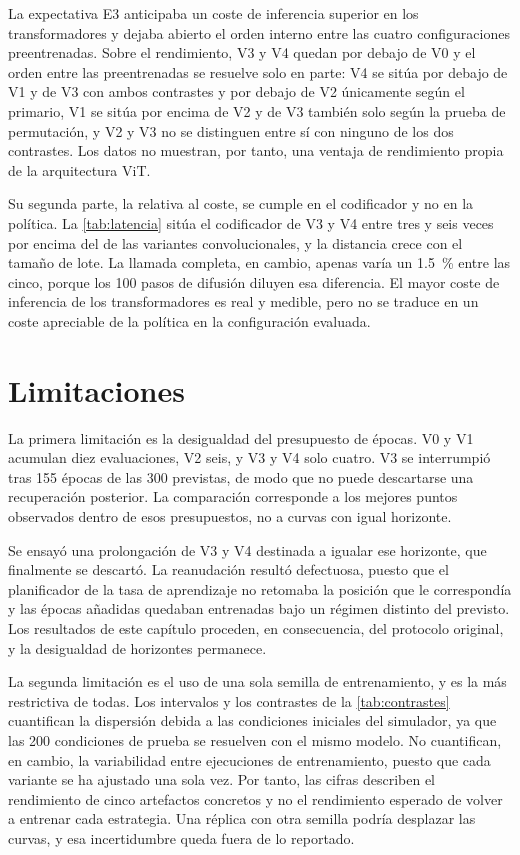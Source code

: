 La expectativa E3 anticipaba un coste de inferencia superior en los transformadores y
dejaba abierto el orden interno entre las cuatro configuraciones preentrenadas. Sobre el
rendimiento, V3 y V4 quedan por debajo de V0 y el orden entre las preentrenadas se resuelve
solo en parte: V4 se sit\'ua por debajo de V1 y de V3 con ambos contrastes y por debajo de V2
\'unicamente seg\'un el primario, V1 se sit\'ua por encima de V2 y de V3 tambi\'en solo
seg\'un la prueba de permutaci\'on, y V2 y V3 no se distinguen entre s\'i con ninguno de los
dos contrastes. Los datos no muestran, por tanto, una ventaja de
rendimiento propia de la arquitectura ViT.

Su segunda parte, la relativa al coste, se cumple en el codificador y no en la pol\'itica.
La \cref{tab:latencia} sit\'ua el codificador de V3 y V4 entre tres y seis veces por encima
del de las variantes convolucionales, y la distancia crece con el tama\~no de lote. La
llamada completa, en cambio, apenas var\'ia un \SI{1.5}{\percent} entre las cinco, porque
los \num{100} pasos de difusi\'on diluyen esa diferencia. El mayor coste de inferencia de
los transformadores es real y medible, pero no se traduce en un coste apreciable de la
pol\'itica en la configuraci\'on evaluada.

\section{Limitaciones}
\label{sec:limitaciones}

La primera limitaci\'on es la desigualdad del presupuesto de \'epocas. V0 y V1 acumulan
diez evaluaciones, V2 seis, y V3 y V4 solo cuatro. V3 se interrumpi\'o tras \num{155}
\'epocas de las \num{300} previstas, de modo que no puede descartarse una recuperaci\'on
posterior. La comparaci\'on corresponde a los mejores puntos observados dentro de esos
presupuestos, no a curvas con igual horizonte.

Se ensay\'o una prolongaci\'on de V3 y V4 destinada a igualar ese horizonte, que finalmente
se descart\'o. La reanudaci\'on result\'o defectuosa, puesto que el planificador de la tasa
de aprendizaje no retomaba la posici\'on que le correspond\'ia y las \'epocas a\~nadidas
quedaban entrenadas bajo un r\'egimen distinto del previsto. Los resultados de este
cap\'itulo proceden, en consecuencia, del protocolo original, y la desigualdad de
horizontes permanece.

La segunda limitaci\'on es el uso de una sola semilla de entrenamiento, y es la m\'as
restrictiva de todas. Los intervalos y los contrastes de la \cref{tab:contrastes}
cuantifican la dispersi\'on debida a las condiciones iniciales del simulador, ya que las
\num{200} condiciones de prueba se resuelven con el mismo modelo. No cuantifican, en
cambio, la variabilidad entre ejecuciones de entrenamiento, puesto que cada variante se ha
ajustado una sola vez. Por tanto, las cifras describen el rendimiento de cinco artefactos
concretos y no el rendimiento esperado de volver a entrenar cada estrategia. Una r\'eplica
con otra semilla podr\'ia desplazar las curvas, y esa incertidumbre queda fuera de lo
reportado.

